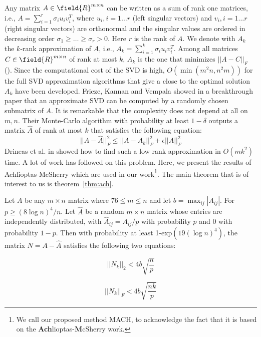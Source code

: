 Any matrix  $A \in \field{R}^{m \times n}$ can be written as a sum of rank one matrices, i.e.,
$A = \sum_{i=1}^r \sigma_i u_i v_i^T$,
where $u_i, i = 1 \ldots r$ (left singular vectors) and $v_i, i = 1 \ldots r$ (right singular vectors) 
are orthonormal and the singular values are ordered in decreasing order
$\sigma_1 \geq \ldots \geq \sigma_r > 0$. Here $r$ is the rank of $A$. 
We denote with $A_k$ the $k$-rank approximation of $A$, i.e., $A_k = \sum_{i=1}^k \sigma_i u_i v_i^T$. 
Among all matrices $C \in \field{R}^{m \times n}$ of rank at most $k$, 
$A_k$ is the one that minimizes $||A-C||_F $ (\cite{Horn:1985:MA}).
Since the computational cost of the SVD is high, $O( \min{(m^2n, n^2m)})$ for the full SVD 
approximation algorithms that give a close to the optimal solution $A_k$ have been developed. 
Frieze, Kannan and Vempala showed in a breakthrough paper \cite{1039494} that an approximate SVD 
can be computed by a randomly chosen submatrix of $A$. It is remarkable that the complexity
does not depend at all on $m,n$. Their Monte-Carlo algorithm with probability at least $1-\delta$ 
outputs a matrix $\hat{A}$ of rank at most $k$ 
that satisfies the following equation: 
\begin{equation} 
||A-\hat{A}||_F^2 \leq ||A-A_k||_F^2 + \epsilon ||A||_F^2
\label{eq:frieze}
\end{equation}
Drineas et al. in \cite{petros} showed how to find such a low rank approximation in $O(mk^2)$ time. 
A lot of work has followed on this problem. Here, we present the results of Achlioptas-McSherry \cite{Achlioptas01fastcomputation} 
which are used in our work\footnote{We call our proposed method MACH, to acknowledge the fact that 
it is based on the \textbf{Ach}lioptas-\textbf{M}cSherry work. }. The main theorem that is of interest to us is theorem~\ref{thm:ach}.



\begin{theorem}
Let $A$ be any $m\times n$ matrix where $ 76 \leq m \leq n$ and let $b= \max_{ij}|A_{ij}|$.
For $p \geq (8 \log{n})^4/n$.
Let $\hat{A}$ be a random $m \times n$ matrix whose entries are independently distributed, with 
$\hat{A}_{ij} = A_{ij}/p$ with probability $p$ and 0 with probability $1-p$. 
Then with probability at least 1-exp$(19(\log n)^4)$, the matrix $N=A-\hat{A}$ satisfies the following two equations:

\begin{equation} 
||N_k||_2 < 4b\sqrt{\frac{n}{p}} 
\label{eq:2normach} 
\end{equation} 

\begin{equation} 
||N_k||_F < 4b\sqrt{\frac{nk}{p}} 
\label{eq:eqfrob} 
\end{equation}

\label{thm:ach}
\end{theorem}


